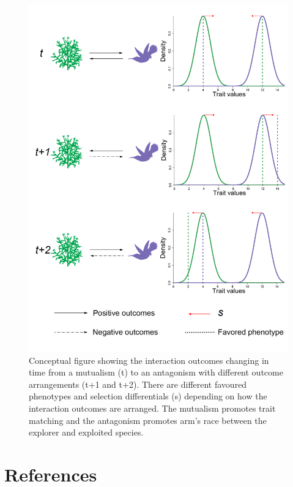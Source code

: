 \documentclass[a4paper, 12pt]{article}
\begin{document}
\begin{figure}
\linespread{1.0}

\includegraphics[width=\textwidth]{Fig1_ConDep.png}
\caption{Conceptual figure showing the interaction outcomes changing in time from a mutualism (t) to an antagonism with different outcome arrangements (t+1 and t+2). There are different favoured phenotypes and selection differentials (s) depending on how the interaction outcomes are arranged. The mutualism promotes trait matching and the antagonism promotes arm's race between the explorer and exploited species.}
\label{fig1}

\end{figure}

\nolinenumbers
\section{References}
\clearpage
\printbibliography[]
\end{document}
